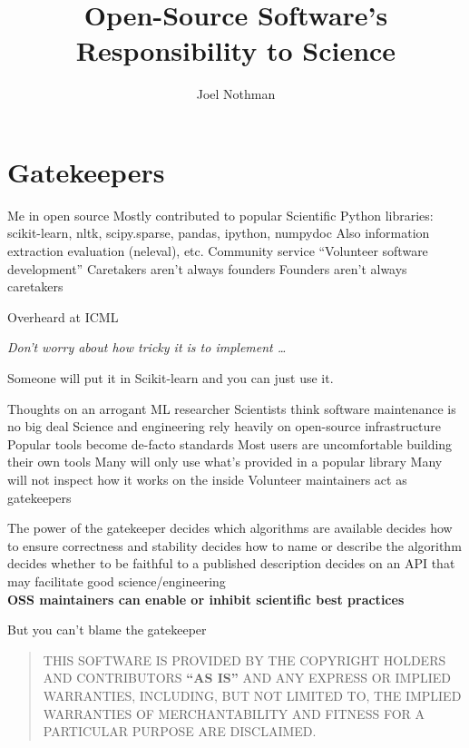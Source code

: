\documentclass[aspectratio=169, 22pt]{beamer}
\title{Open-Source Software's Responsibility to Science}
\subtitle{}
\author{Joel Nothman}
\newcommand{\hl}{\textcolor{usydred}}
\begin{document}
\titleslide

\section{Gatekeepers}

\begin{points}{Me in open source}
	\p Mostly contributed to popular Scientific Python libraries:\\
	scikit-learn, nltk, scipy.sparse, pandas, ipython, numpydoc
	\p Also information extraction evaluation (neleval), etc.
	\vfill
	\p Community service
	\p ``Volunteer software development''
	\vfill
	\p Caretakers aren't always founders
	\p Founders aren't always caretakers
\end{points}

\begin{centre}{Overheard at ICML}
	\parbox{\textwidth}{
		\Large
		\it
	Don't worry about how tricky it is to implement \ldots

	\vspace{2em}

	\raggedleft Someone will put it in Scikit-learn and you can just use it.
	}
\end{centre}

\begin{points}{Thoughts on an arrogant ML researcher}
	\p Scientists think software maintenance is no big deal
	\pause
	\vfill
	\p Science and engineering rely heavily on open-source infrastructure
	\p Popular tools become de-facto standards
	\vfill
	\p Most users are uncomfortable building their own tools
	\p Many will only use what's provided in a popular library
	\p Many will not inspect how it works on the inside
	\vfill
	\p Volunteer maintainers act as gatekeepers
\end{points}

\begin{points}{The power of the gatekeeper}
	\p decides \hl{which algorithms} are available
	\p decides how to ensure \hl{correctness} and stability
	\p decides how to \hl{name} or describe the algorithm
	\p decides whether to be \hl{faithful} to a published description
	\p decides on an \hl{API} that may facilitate good science/engineering
	\\
	\pause
	\vspace{2em}
	\hl{\bf OSS maintainers can enable or inhibit scientific best practices}
\end{points}

\begin{centre}{But you can't blame the gatekeeper}
	\begin{quote}
	THIS SOFTWARE IS PROVIDED BY THE COPYRIGHT HOLDERS AND CONTRIBUTORS \textbf{``AS IS''}
	AND ANY EXPRESS OR IMPLIED WARRANTIES, INCLUDING, BUT NOT LIMITED TO, THE
	IMPLIED WARRANTIES OF MERCHANTABILITY AND FITNESS FOR A PARTICULAR PURPOSE
	ARE DISCLAIMED.
	\end{quote}
\end{centre}
\end{document}
